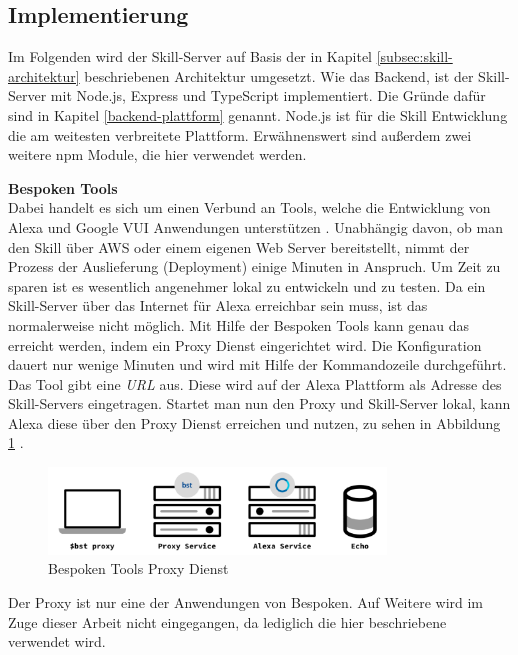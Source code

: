 \subsection{Implementierung}
\label{subsec:skill-implementierung}
Im Folgenden wird der Skill-Server auf Basis der in Kapitel \ref{subsec:skill-architektur} beschriebenen Architektur umgesetzt. Wie das Backend, ist der Skill-Server mit Node.js, Express und TypeScript implementiert. Die Gründe dafür sind in Kapitel \ref{backend-plattform} genannt. Node.js ist für die Skill Entwicklung die am weitesten verbreitete  Plattform. Erwähnenswert sind außerdem zwei weitere \ac{npm} Module, die hier verwendet werden. 

\textbf{Bespoken Tools}\\
Dabei handelt es sich um einen Verbund an Tools, welche die Entwicklung von Alexa und Google \ac{VUI} Anwendungen unterstützen \cite{bespoken}. Unabhängig davon, ob man den Skill über \ac{AWS} oder einem eigenen Web Server bereitstellt, nimmt der Prozess der Auslieferung (Deployment) einige Minuten in Anspruch. Um Zeit zu sparen ist es wesentlich angenehmer lokal zu entwickeln und zu testen. Da ein Skill-Server über das Internet für Alexa erreichbar sein muss, ist das normalerweise nicht möglich. Mit Hilfe der Bespoken Tools kann genau das erreicht werden, indem ein Proxy Dienst eingerichtet wird. Die Konfiguration dauert nur wenige Minuten und wird mit Hilfe der Kommandozeile durchgeführt. Das Tool gibt eine \textit{\ac{URL}} aus. Diese wird auf der Alexa Plattform als Adresse des Skill-Servers eingetragen. Startet man nun den Proxy und Skill-Server lokal, kann Alexa diese über den Proxy Dienst erreichen und nutzen, zu sehen in  Abbildung \ref{fig:bst-proxy} \cite{bespoken}.

\begin{figure}[!htb]
    \centering
    \includegraphics[width=0.8\textwidth]{bilder/4_bstProxy.png}
    \caption{Bespoken Tools Proxy Dienst}
    \label{fig:bst-proxy}
\end{figure}

Der Proxy ist nur eine der Anwendungen von Bespoken. Auf Weitere wird im Zuge dieser Arbeit nicht eingegangen, da lediglich die hier beschriebene verwendet wird.

